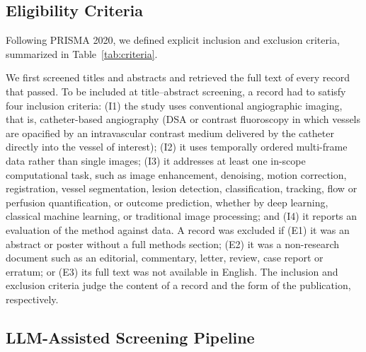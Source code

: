 \subsection{Eligibility Criteria}
\label{sec:eligibility}
Following PRISMA 2020, we defined explicit inclusion and exclusion criteria, summarized in Table~\ref{tab:criteria}. 


We first screened titles and abstracts and retrieved the full text of every record that passed.  To be included at title--abstract screening, a record had to satisfy four inclusion criteria: (I1) the study uses conventional angiographic imaging, that is, catheter-based angiography (DSA or contrast fluoroscopy in which vessels are opacified by an intravascular contrast medium delivered by the catheter directly into the vessel of interest); (I2) it uses temporally ordered multi-frame data rather than single images; (I3) it addresses at least one in-scope computational task, such as image enhancement, denoising, motion correction, registration, vessel segmentation, lesion detection, classification, tracking, flow or perfusion quantification, or outcome prediction, whether by deep learning, classical machine learning, or traditional image processing; and (I4) it reports an evaluation of the method against data. A record was excluded if (E1) it was an abstract or poster without a full methods section; (E2) it was a non-research document such as an editorial, commentary, letter, review, case report or erratum; or (E3) its full text was not available in English.  The inclusion and exclusion criteria judge the content of a record and the form of the publication, respectively.


\subsection{LLM-Assisted Screening Pipeline}
\label{sec:llm-pipeline}

